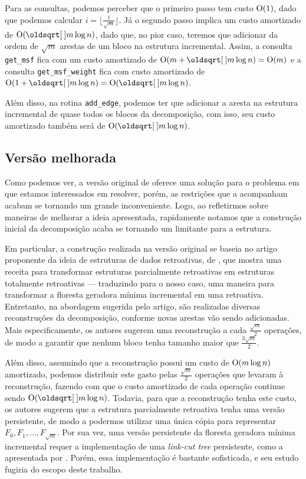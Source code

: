 Para as consultas, podemos perceber que o primeiro passo tem custo $\mathrm{O}(1)$, dado que podemos calcular $i = \lfloor \frac{t}{\sqrt{m}} \rfloor$. Já o segundo passo implica um custo amortizado de $\Oh(\sqrt{m} \log n)$, dado que, no pior caso, teremos que adicionar da ordem de $\sqrt{m}$ arestas de um bloco na estrutura incremental. Assim, a consulta \texttt{get\_msf} fica com um custo amortizado de $\Oh(m + \sqrt{m} \log n) = \Oh(m)$ e a consulta \texttt{get\_msf\_weight} fica com custo amortizado de $\Oh(1 + \sqrt{m} \log n) = \Oh(\sqrt{m} \log n)$.

Além disso, na rotina \texttt{add\_edge}, podemos ter que adicionar a aresta na estrutura incremental de quase todos os blocos da decomposição, com isso, seu custo amortizado também será de $\Oh(\sqrt{m} \log n)$.

\subsection{Versão melhorada}
\label{sec:rmsf-versao-mel}

Como podemos ver, a versão original de \citet{10.1093/comjnl/bxaa135} oferece uma solução para o problema em que estamos interessados em resolver, porém, as restrições que a acompanham acabam se tornando um grande inconveniente. Logo, ao refletirmos sobre maneiras de melhorar a ideia apresentada, rapidamente notamos que a construção inicial da decomposição acaba se tornando um limitante para a estrutura.

Em particular, a construção realizada na versão original se baseia no artigo proponente da ideia de estruturas de dados retroativas, de \citet{10.1145/1240233.1240236}, que mostra uma receita para transformar estruturas parcialmente retroativas em estruturas totalmente retroativas --- traduzindo para o nosso caso, uma maneira para transformar a floresta geradora mínima incremental em uma retroativa. Entretanto, na abordagem sugerida pelo artigo, são realizadas diversas reconstruções da decomposição, conforme novas arestas vão sendo adicionadas. Mais especificamente, os autores sugerem uma reconstrução a cada $\frac{\sqrt{m}}{2}$ operações, de modo a garantir que nenhum bloco tenha tamanho maior que $\frac{3\sqrt{m}}{2}$.

Além disso, assumindo que a reconstrução possui um custo de $\mathrm{O}(m \log n)$ amortizado, podemos distribuir este gasto pelas $\frac{\sqrt{m}}{2}$ operações que levaram à reconstrução, fazendo com que o custo amortizado de cada operação continue sendo $\Oh(\sqrt{m} \log n)$. Todavia, para que a reconstrução tenha este custo, os autores sugerem que a estrutura parcialmente retroativa tenha uma versão persistente, de modo a  podermos utilizar uma única cópia para representar $F_0, F_1, \dots, F_{\sqrt{m}}$. Por sua vez, uma versão persistente da floresta geradora mínima incremental requer a implementação de uma \emph{link-cut tree} persistente, como a apresentada por \citet{10.1007/978-3-540-69903-3_16}. Porém, essa implementação é bastante sofisticada, e seu estudo fugiria do escopo deste trabalho.

